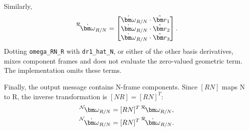 Similarly,
\begin{equation}
    \leftexp{R}{\dot{\bm\omega}_{R/N}} =
    \begin{bmatrix}
        \dot{\bm\omega}_{R/N}\cdot\hat{\bm r}_1 \\
        \dot{\bm\omega}_{R/N}\cdot\hat{\bm r}_2 \\
        \dot{\bm\omega}_{R/N}\cdot\hat{\bm r}_3
    \end{bmatrix}.
\end{equation}
Dotting \texttt{omega\_RN\_R} with \texttt{dr1\_hat\_N}, or either of the other basis derivatives, mixes component frames and does not evaluate the zero-valued geometric term. The implementation omits these terms.

Finally, the output message contains N-frame components. Since $[RN]$ maps N to R, the inverse transformation is $[NR]=[RN]^T$:
\begin{subequations}
    \begin{align}
        \leftexp{N}{\bm\omega_{R/N}} &= [RN]^T\,\leftexp{R}{\bm\omega_{R/N}}, \\
        \leftexp{N}{\dot{\bm\omega}_{R/N}} &= [RN]^T\,\leftexp{R}{\dot{\bm\omega}_{R/N}}.
    \end{align}
\end{subequations}
